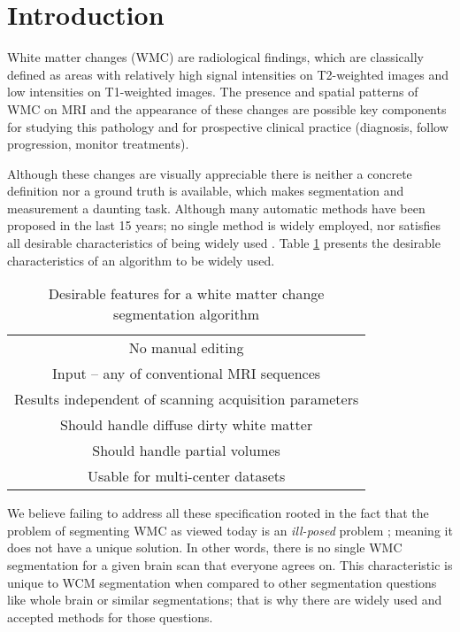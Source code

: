 \section{Introduction} \label{intro}


White matter changes (WMC) are radiological findings, which are classically defined as areas with relatively high signal intensities on T2-weighted images and low intensities on T1-weighted images. The presence and spatial patterns of WMC on MRI and the appearance of these changes are possible key components for studying this pathology and for prospective clinical practice (diagnosis, follow progression, monitor treatments).

Although these changes are visually appreciable there is neither a concrete definition nor a ground truth is available, which makes segmentation and measurement a daunting task. Although many automatic methods have been proposed in the last 15 years; no single method is widely employed, nor satisfies all desirable characteristics of being widely used \cite{GarciaReview}. Table \ref{Table:Requirements} presents the desirable characteristics of an algorithm to be widely used.

\begin{table}
\centering
    \begin{tabular}  {  c }
    \hline
        No manual editing \\ 
        Input – any of conventional MRI sequences \\ 
        Results independent of scanning acquisition parameters \\ 
        Should handle diffuse dirty white matter \\ 
        Should handle partial volumes \\ 
        Usable for multi-center datasets \\
    \hline
    \end{tabular} 
    \caption{Desirable features for a white matter change segmentation algorithm } 
    \label{Table:Requirements}
\end{table}
    
We believe failing to address all these specification rooted in the fact that the problem of segmenting WMC as viewed today is an \textit{ill-posed} problem \cite{IllPosed}; meaning it does not have a unique solution. In other words, there is no single WMC segmentation for a given brain scan that everyone agrees on. This characteristic is unique to WCM segmentation when compared to other segmentation questions like whole brain or similar segmentations; that is why there are widely used and accepted methods for those questions.

